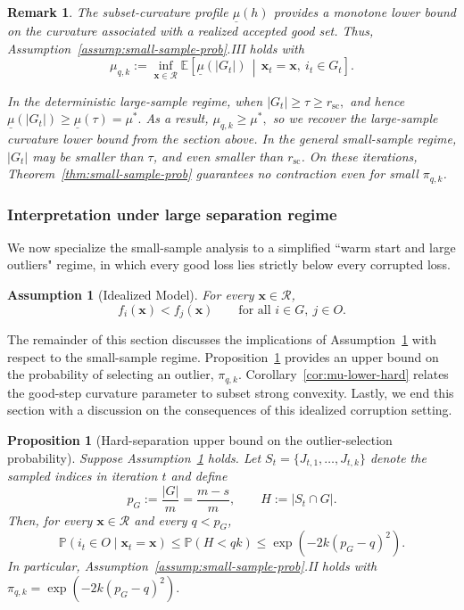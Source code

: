 \documentclass[11pt]{article}
\newcommand{\ve}[1]{\mathbf{#1}}
\newtheorem{assump}{Assumption}
\newtheorem{prop}{Proposition}
\newtheorem{rem}{Remark}
\begin{document}
\begin{rem}
The subset-curvature profile \(\underline{\mu}(h)\) provides a monotone
lower bound on the curvature associated with a realized accepted good set.
Thus, Assumption~\ref{assump:small-sample-prob}.III holds with
\[
\mu_{q,k}
:=
\inf_{\ve{x}\in\mathcal R}
\mathbb{E}\!\left[
\underline{\mu}(|G_t|)
\,\middle|\,
\ve{x}_t=\ve{x},\ i_t\in G_t
\right].
\]


In the deterministic large-sample regime, when
$|G_t|\ge\tau\ge r_{\mathrm{sc}},$
and hence
$
\underline{\mu}(|G_t|)
\ge
\underline{\mu}(\tau)
=
\mu^*.$ As a result, $\mu_{q,k}\ge\mu^*,$
so we recover the large-sample curvature lower bound from the section above.  In the
general small-sample regime, \(|G_t|\) may be smaller than \(\tau\), and even smaller than
\(r_{\mathrm{sc}}\). On these iterations, Theorem~\ref{thm:small-sample-prob} guarantees no contraction even for small $\pi_{q,k}$.
\end{rem}


\subsubsection{Interpretation under large separation regime}
\label{sec:small-sample-hard-separation}

We now specialize the small-sample analysis to a simplified ``warm start and large outliers"
regime, in which every good loss lies strictly below every corrupted loss.


{\begin{assump}[Idealized Model]
    For every \(\ve{x}\in\mathcal R\),
\begin{equation}\label{eq:hard-separation}
f_i(\ve{x})<f_j(\ve{x})
\qquad
\text{for all } i\in G,\ j\in O.
\end{equation}
\label{assump:hard-separation}
\end{assump}}
{The remainder of this section discusses the implications of Assumption~\ref{assump:hard-separation} with respect to the small-sample regime. Proposition~\ref{prop:hard-pi} provides an upper bound on the probability of selecting an outlier, $\pi_{q,k}$. Corollary~\ref{cor:mu-lower-hard} relates the good-step curvature parameter to subset strong convexity. Lastly, we end this section with a discussion on the consequences of this idealized corruption setting. }


\begin{prop}[Hard-separation upper bound on the outlier-selection probability]
\label{prop:hard-pi}
Suppose Assumption~\ref{assump:hard-separation} holds. Let \({S_t =} \{J_{t,1},\dots,J_{t,k}\}\) denote the
sampled indices in iteration $t$ and define
\begin{equation}\label{eq:pg}
p_G:=\frac{|G|}{m}=\frac{m-s}{m},
\qquad
H:=|S_t\cap G|.
\end{equation}
Then, for every \(\ve{x}\in\mathcal R\) and every \(q<p_G\),
\[
\mathbb{P}(i_t\in O\mid \ve{x}_t=\ve{x})
\le
\mathbb{P}(H<qk)
\le
\exp\left(-2k(p_G-q)^2\right).
\]
In particular, Assumption~\ref{assump:small-sample-prob}.II holds with
$
\pi_{q,k}
=
\exp\left(-2k(p_G-q)^2\right).
$
\end{prop}
\end{document}
